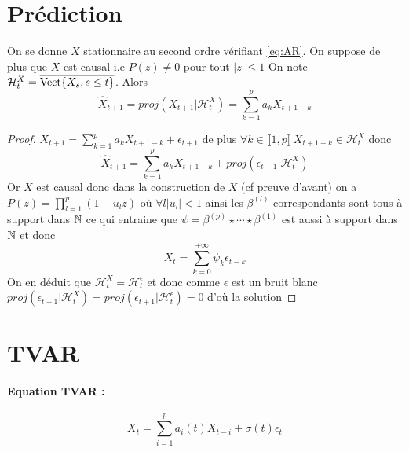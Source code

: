 \documentclass[a4paper,french]{article}
\begin{document}
\section{Prédiction}
\begin{Prop}
On se donne $X$ stationnaire au second ordre vérifiant \eqref{eq:AR}. On suppose de plus que $X$ est causal i.e $P(z) \neq 0$ pour tout $|z| \leq 1$
On note $\mathcal{H}_t^X = \overline{\mathrm{Vect}{ \left\lbrace X_s, s\leq t \right\rbrace }}$. Alors
\[ \hat{X}_{t+1} = proj(X_{t+1} | \mathcal{H}_t^X ) = \sum_{k=1}^p a_k X_{t+1-k} \]
\end{Prop}
\begin{proof}
$X_{t+1} = \sum_{k=1}^p a_k X_{t+1-k} +\epsilon_{t+1}$ de plus $\forall k \in \llbracket 1,p \rrbracket \, X_{t+1-k} \in \mathcal{H}_t^X$ donc
\[ \hat{X}_{t+1} = \sum_{k=1}^p a_k X_{t+1-k} + proj(\epsilon_{t+1} | \mathcal{H}_t^X ) \]
Or $X$ est causal donc dans la construction de $X$ (cf preuve d'avant) on a $P(z)= \prod_{l=1}^p (1-u_l z)$ où $\forall l |u_l|<1$ ainsi les $\beta^{(l)}$ correspondants sont tous à support dans $\mathbb{N}$ ce qui entraine que $\psi = \beta^{(p)} \star \cdots \star \beta^{(1)}$ est aussi à support dans $\mathbb{N}$ et donc 
\[ X_t = \sum_{k=0}^{+\infty} \psi_k \epsilon_{t-k}\] On en déduit que $\mathcal{H}_t^X = \mathcal{H}_t^\epsilon$ et donc comme $\epsilon$ est un bruit blanc $proj(\epsilon_{t+1} | \mathcal{H}_t^X ) = proj(\epsilon_{t+1} | \mathcal{H}_t^\epsilon ) = 0$ d'où la solution
\end{proof}

\section{TVAR}
\paragraph{Equation TVAR :}
\begin{equation} \label{eq:TVAR}
X_t = \sum_{i=1}^p a_i(t) X_{t-i} + \sigma(t) \epsilon_t
\end{equation}
\end{document}
